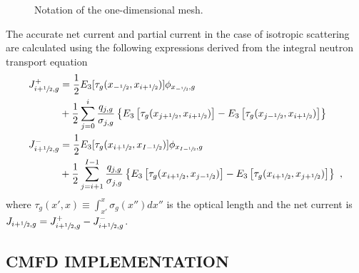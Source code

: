\documentclass[letterpaper]{physor2020}
\newcommand{\mcL}{\tau}
\newcommand{\jp}{\ensuremath{J^+}}
\newcommand{\jm}{\ensuremath{J^-}}
\newcommand{\hzi}{\ensuremath{\sfrac{1}{2}}}
\begin{document}
\begin{figure}[htbp!] 
	\centering
	\caption{Notation of the one-dimensional mesh.}
	\label{fig:mesh1D}
\end{figure}
 
The accurate net current and partial current in the case of isotropic scattering are calculated using the following expressions derived from the integral neutron transport equation~\cite{Tomatis-2011,Tomatis-2019,Gross-2020}
\begin{align}\label{eq:par-curr-calc}
\jp_{i+\hzi,g} &=  \frac{1}{2}
E_3[\mcL_g(x_{-\hzi},x_{i+\hzi})] \phi_{x_{-\hzi},g} \nonumber \\
&+
\frac{1}{2}\sum\limits_{j=0}^i \frac{q_{j,g}}{\sigma_{j,g}}
\left\{ 
E_3\left[
\mcL_g(x_{j+\hzi},x_{i+\hzi}) 
\right]
- E_3\left[
\mcL_g(x_{j-\hzi},x_{i+\hzi})
\right] 
\right\} 
\nonumber \\
\jm_{i+\hzi,g} &=  \frac{1}{2}
E_3[\mcL_g(x_{i+\hzi},x_{I-\hzi})] \phi_{x_{I-\hzi},g} \nonumber \\
&+
\frac{1}{2}\sum\limits_{j=i+1}^{I-1} \frac{q_{j,g}}{\sigma_{j,g}}
\left\{ 
E_3\left[
\mcL_g(x_{i+\hzi},x_{j-\hzi}) 
\right]
- E_3\left[ 
\mcL_g(x_{i+\hzi},x_{j+\hzi})
\right] 
\right\} \,\, ,
\end{align}
where $\mcL_g(x',x)\equiv \int_{x'}^{x} \sigma_g(x'')dx''$ is the optical length and the net current is $J _{i+\hzi,g} = \jp _{i+\hzi,g} - \jm _{i+\hzi,g}$.

\subsection{CMFD IMPLEMENTATION} 
\label{sec:RM-CMFD}
\end{document}

